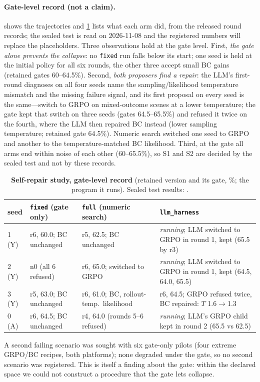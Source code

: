 \paragraph{Gate-level record (not a claim).}  shows the trajectories and \cref{tab:selfrepair} lists what each arm did, from the released round records; the sealed test is read on 2026-11-08 and the registered numbers will replace the placeholders. Three observations hold at the gate level. First, \emph{the gate alone prevents the collapse}: no \texttt{fixed} run falls below its start; one seed is held at the initial policy for all six rounds, the other three accept small BC gains (retained gates 60--64.5\%). Second, \emph{both proposers find a repair}: the LLM's first-round diagnoses on all four seeds name the sampling/likelihood temperature mismatch and the missing failure signal, and its first proposal on every seed is the same---switch to GRPO on mixed-outcome scenes at a lower temperature; the gate kept that switch on three seeds (gates 64.5--65.5\%) and refused it twice on the fourth, where the LLM then repaired BC instead (lower sampling temperature; retained gate 64.5\%). Numeric search switched one seed to GRPO and another to the temperature-matched BC likelihood. Third, at the gate all arms end within noise of each other (60--65.5\%), so S1 and S2 are decided by the sealed test and not by these records.

\begin{table}[t]
  \centering
  \small
  \caption{\textbf{Self-repair study, gate-level record} (retained version and its gate, \%; the program it runs). Sealed test results: \pending.}
  \label{tab:selfrepair}
  \begin{tabular}{@{}llll@{}}
    \toprule
    seed & \texttt{fixed} (gate only) & \texttt{full} (numeric search) & \texttt{llm\_harness} \\
    \midrule
    1 (Y) & r6, 60.0; BC unchanged & r5, 62.5; BC unchanged & \textit{running}; LLM switched to GRPO in round 1, kept (65.5 by r3) \\
    2 (Y) & n0 (all 6 refused) & r6, 65.0; switched to GRPO & \textit{running}; LLM switched to GRPO in round 1, kept (64.5, 64.0, 65.5) \\
    3 (Y) & r5, 63.0; BC unchanged & r6, 61.0; BC, rollout-temp.\ likelihood & r6, 64.5; GRPO refused twice, BC repaired: $T$ 1.6$\to$1.3 \\
    0 (A) & r6, 64.5; BC unchanged & r4, 64.0 (rounds 5--6 refused) & \textit{running}; LLM's GRPO child kept in round 2 (65.5 vs 62.5) \\
    \bottomrule
  \end{tabular}
\end{table}

A second failing scenario was sought with six gate-only pilots (four extreme GRPO/BC recipes, both platforms); none degraded under the gate, so no second scenario was registered. This is itself a finding about the gate: within the declared space we could not construct a procedure that the gate lets collapse.
